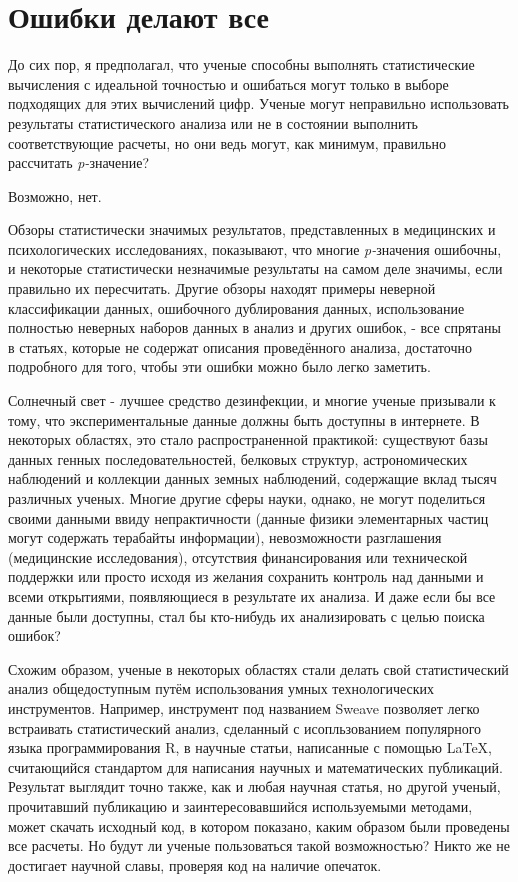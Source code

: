 \chapter{Ошибки делают все}
\label{chp9}

До сих пор, я предполагал, что ученые способны выполнять статистические вычисления с идеальной точностью и ошибаться могут только в выборе подходящих для этих вычислений цифр. Ученые могут неправильно использовать результаты статистического анализа или не в состоянии выполнить соответствующие расчеты, но они ведь могут, как минимум, правильно рассчитать \emph{p-}значение?

Возможно, нет. 

Обзоры статистически значимых результатов, представленных в медицинских и психологических исследованиях, показывают, что многие \emph{p-}значения ошибочны, и некоторые статистически незначимые результаты на самом деле значимы, если правильно их пересчитать. \cite{gotzsche_believability_2006,bakker_misreporting_2011} Другие обзоры находят примеры неверной классификации данных, ошибочного дублирования данных, использование полностью неверных наборов данных в анализ и других ошибок, - все спрятаны в статьях, которые не содержат описания проведённого анализа, достаточно подробного для того, чтобы эти ошибки можно было легко заметить. \cite{baggerly_deriving_2009,gotzsche_methodology_1989} 

Солнечный свет - лучшее средство дезинфекции, и многие ученые призывали к тому, что экспериментальные данные должны быть доступны в интернете. В некоторых областях, это стало распространенной практикой: существуют базы данных генных последовательностей, белковых структур, астрономических наблюдений и коллекции данных земных наблюдений, содержащие вклад тысяч различных ученых. Многие другие сферы науки, однако, не могут поделиться своими данными ввиду непрактичности (данные физики элементарных частиц могут содержать терабайты информации), невозможности разглашения (медицинские исследования), отсутствия финансирования или технической поддержки или просто исходя из желания сохранить контроль над данными и всеми открытиями, появляющиеся в результате их анализа. И даже если бы все данные были доступны, стал бы кто-нибудь их анализировать с целью поиска ошибок?   

Схожим образом, ученые в некоторых областях стали делать свой статистический анализ общедоступным путём использования умных технологических инструментов. Например, инструмент под названием Sweave позволяет легко встраивать статистический анализ, сделанный с исопльзованием популярного языка программирования R, в научные статьи, написанные с помощью \LaTeX, считающийся стандартом для написания научных и математических публикаций. Результат выглядит точно также, как и любая научная статья, но другой ученый, прочитавший публикацию и заинтересовавшийся используемыми методами, может скачать исходный код, в котором показано, каким образом были проведены все расчеты. Но будут ли ученые пользоваться такой возможностью? Никто же не достигает научной славы, проверяя код на наличие опечаток.

